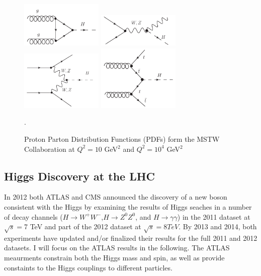 \begin{figure}[!t]
\centering 
\includegraphics[width=0.35\textwidth]{figs/ggF.pdf}
\includegraphics[width=0.35\textwidth]{figs/vh.pdf}
\includegraphics[width=0.35\textwidth]{figs/vbf.pdf}
\includegraphics[width=0.35\textwidth]{figs/tth.pdf}
\caption {Proton Parton Distribution Functions (PDFs) form the MSTW Collaboration at $Q^2 = 10$ GeV$^2$ and $Q^2 = 10^4$ GeV$^2$}.
\label{figure:theory_higgsdiagrams}
\end{figure}



\subsection{Higgs Discovery at the LHC}

In 2012 both ATLAS and CMS announced the discovery of a new boson consistent
with the Higgs by examining the results of Higgs seaches in a number of decay
channels ($H\rightarrow W^+W^-$,$H\rightarrow Z^0Z^0$, and
    $H\rightarrow\gamma\gamma$) in the 2011 dataset at $\sqrt{s}=$7 TeV and
part of the 2012 dataset at $\sqrt{s}=8 TeV$. By 2013 and 2014, both
experiments have updated and/or finalized their results for the full 2011 and
2012 datasets. I will focus on the ATLAS results in the following. The
ATLAS meaurments constrain both the Higgs mass and spin, as well as 
provide constaints to the Higgs couplings to different particles. 

